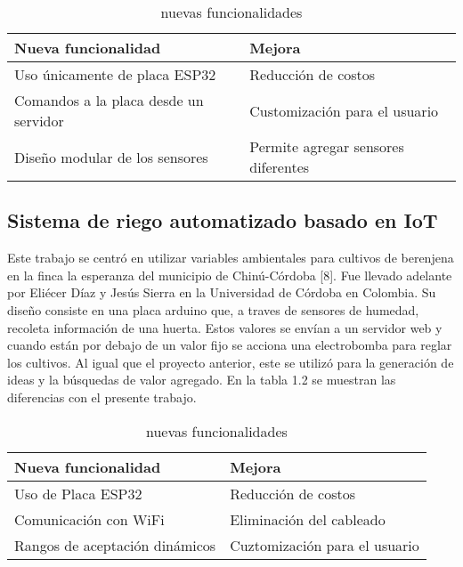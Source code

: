 \begin{table}[h]
	\centering
	\caption[nuevas funcionalidades sobre el proyecto de Cadavid y Garcia]{nuevas funcionalidades}
	\begin{tabular}{l l}    
		\toprule
		\textbf{Nueva funcionalidad} & \textbf{Mejora}\\	
		\midrule
		Uso únicamente de placa ESP32           & Reducción de costos	\\		
		Comandos a la placa desde un servidor          & Customización para el usuario\\	
		Diseño modular de los sensores          & Permite agregar sensores diferentes\\	
		\bottomrule
		\hline
	\end{tabular}
	\label{tab:peces}
\end{table}

\subsection{Sistema de riego automatizado basado en IoT}
Este trabajo se centró en utilizar variables ambientales para cultivos de berenjena en la finca la esperanza del municipio de Chinú-Córdoba [8]. Fue llevado adelante por Eliécer Díaz y Jesús Sierra en la Universidad de Córdoba en Colombia. 
Su diseño consiste en una placa arduino que, a traves de sensores de humedad, recoleta información de una huerta. Estos valores se envían a un servidor web y cuando están por debajo de un valor fijo se acciona una electrobomba para reglar los cultivos. Al igual que el proyecto anterior, este se utilizó para la generación de ideas y la búsquedas de valor agregado. En la tabla 1.2 se muestran las diferencias con el presente trabajo.\\

\begin{table}[h]
	\centering
	\caption[nuevas funcionalidades sobre el proyecto de Díaz y Sierra]{nuevas funcionalidades}
	\begin{tabular}{l l}    
		\toprule
		\textbf{Nueva funcionalidad} & \textbf{Mejora}\\	
		\midrule
		Uso de Placa ESP32           & Reducción de costos	\\		
		Comunicación con WiFi          & Eliminación del cableado\\	
		Rangos de aceptación dinámicos          & Cuztomización para el usuario\\		
		\bottomrule
		\hline
	\end{tabular}
	\label{tab:peces}\\
\end{table}

